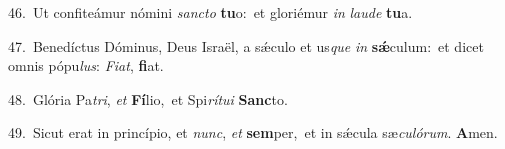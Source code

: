 {\numbfont\textcolor{\numbcolor}{46.}}~Ut confiteámur nómini \textit{sanc}\-\textit{to} \textbf{tu}\-o:~\star et gloriémur \textit{in} \textit{lau}\-\textit{de} \textbf{tu}\-a.\par
{\numbfont\textcolor{\numbcolor}{47.}}~Benedíctus Dóminus, Deus Israël, a sǽculo et us\textit{que} \textit{in} \textbf{sǽ}\-culum:~\star et dicet omnis pópu\-\textit{lus}\-: \textit{Fi}\-\textit{at}, \textbf{fi}\-at.\par
{\numbfont\textcolor{\numbcolor}{48.}}~Glória Pa\-\textit{tri}\-, \textit{et} \textbf{Fí}\-lio,~\star et Spi\-\textit{rí}\-\textit{tu}\textit{i} \textbf{Sanc}\-to.\par
{\numbfont\textcolor{\numbcolor}{49.}}~Sicut erat in princípio, et \textit{nunc}\-, \textit{et} \textbf{sem}\-per,~\star et in sǽcula sæ\-\textit{cu}\-\textit{ló}\textit{rum}. \textbf{A}\-men.\par
